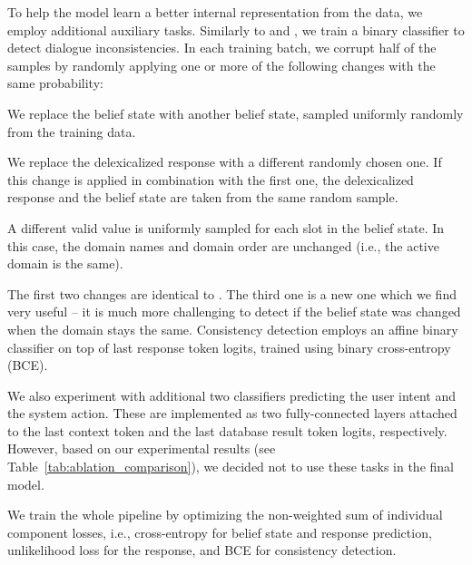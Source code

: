 \documentclass[11pt]{article}
\begin{document}
To help the model learn a better internal representation from the data, we employ additional auxiliary tasks. Similarly to \citet{devlin2019} and \citet{peng2020}, we train a binary classifier to detect dialogue inconsistencies. In each training batch, we corrupt half of the samples by randomly applying one or more of the following changes with the same probability:
\begin{compactenum}
    \item We replace the belief state  with another belief state, sampled uniformly randomly from the training data.
    \item We replace the delexicalized response  with a different randomly chosen one. If this change is applied in combination with the first one, the delexicalized response and the belief state are taken from the same random sample.
    \item A different valid value is uniformly sampled for each slot in the belief state. In this case, the domain names and domain order are unchanged (i.e., the active domain is the same).
\end{compactenum}
\vspace{\parsep}

The first two changes are identical to \citet{peng2020}. The third one is a new one which we find very useful 
-- it is much more challenging to detect if the belief state was changed when the domain stays the same.
Consistency detection employs an affine binary classifier
on top of last response token logits, trained using binary cross-entropy (BCE).

We also experiment with additional two classifiers predicting the user intent and the system action. These are implemented as two fully-connected layers attached to the last context token and the last database result token logits, respectively. 
However, based on our experimental results (see Table~\ref{tab:ablation_comparison}), we decided not to use these tasks in the final model.

We train the whole pipeline by optimizing the non-weighted sum of individual component losses, i.e., cross-entropy for belief state and response prediction, unlikelihood loss for the response, and BCE for consistency detection.
\end{document}
